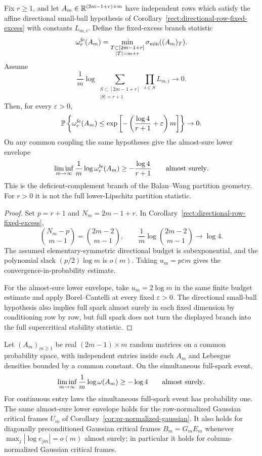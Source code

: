 \begin{corollary}\label{cor:pr-directional-branch}
Fix \(r\ge1\), and let \(A_m\in\mathbb{R}^{(2m-1+r)\times m}\) have independent rows
which satisfy the affine directional small-ball hypothesis of
Corollary~\ref{rect:directional-row-fixed-excess} with constants \(L_{m,i}\).
Define the fixed-excess branch statistic
\[
  \omega_r^{\rm fe}(A_m)
  =
  \min_{\substack{T\subset[2m-1+r]\\ |T|=m+r}}\sigma_{\min}((A_m)_T).
\]
Assume
\[
  \frac1m\log
  \sum_{\substack{S\subset[2m-1+r]\\ |S|=r+1}}
  \prod_{i\in S}L_{m,i}\longrightarrow0 .
\]
Then, for every \(\varepsilon>0\),
\[
  \mathbb{P}\left\{\omega_r^{\rm fe}(A_m)
  \le \exp\left[-\left(\frac{\log4}{r+1}+\varepsilon\right)m\right]\right\}
  \to0 .
\]
On any common coupling the same hypotheses give the almost-sure lower envelope
\[
  \liminf_{m\to\infty}\frac1m\log\omega_r^{\rm fe}(A_m)
  \ge -\frac{\log4}{r+1}
  \qquad\hbox{almost surely}.
\]
This is the deficient-complement branch of the Balan--Wang partition geometry.
For \(r>0\) it is not the full lower-Lipschitz partition statistic.
\end{corollary}

\begin{proof}
Set \(p=r+1\) and \(N_m=2m-1+r\).  In
Corollary~\ref{rect:directional-row-fixed-excess},
\[
  \binom{N_m-p}{m-1}=\binom{2m-2}{m-1},
  \qquad
  \frac1m\log\binom{2m-2}{m-1}\to\log4 .
\]
The assumed elementary-symmetric directional budget is subexponential, and the
polynomial slack \((p/2)\log m\) is \(o(m)\).  Taking
\(u_m=p\varepsilon m\) gives the convergence-in-probability estimate.

For the almost-sure lower envelope, take \(u_m=2\log m\) in the same finite
budget estimate and apply Borel--Cantelli at every fixed \(\varepsilon>0\).
The directional small-ball hypothesis also implies full spark almost surely in
each fixed dimension by conditioning row by row, but full spark does not turn
the displayed branch into the full supercritical stability statistic.
\end{proof}

\begin{corollary}\label{cor:pr-as-lower-envelope}
Let \((A_m)_{m\ge1}\) be real \((2m-1)\times m\) random matrices on a common
probability space, with independent entries inside each \(A_m\) and Lebesgue
densities bounded by a common constant.  On the simultaneous full-spark event,
\[
  \liminf_{m\to\infty}\frac1m\log\omega(A_m)\ge-\log4
  \qquad\hbox{almost surely}.
\]
For continuous entry laws the simultaneous full-spark event has probability
one.  The same almost-sure lower envelope holds for the row-normalized
Gaussian critical frames \(U_m\) of
Corollary~\ref{cor:pr-normalized-gaussian}.  It also holds for
diagonally preconditioned Gaussian critical frames \(B_m=G_mE_m\) whenever
\(\max_j|\log e_{jm}|=o(m)\) almost surely; in particular it holds for
column-normalized Gaussian critical frames.
\end{corollary}

